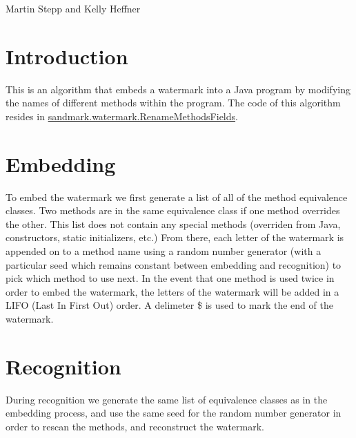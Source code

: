 %
          {Martin Stepp and Kelly Heffner}

\section{Introduction}
This is an algorithm that embeds a watermark into a Java program by 
modifying the names of different methods within the program.
The code of this algorithm
resides in \url{sandmark.watermark.RenameMethodsFields}.


\section{Embedding}
To embed the watermark we first generate a list of all of the method
equivalence classes.  Two methods are in the same equivalence class
if one method overrides the other.  This list does not contain any 
special methods (overriden from Java, constructors, static initializers, 
etc.)  From there, each letter of the watermark is appended on to a
method name using a  random number generator (with a particular seed which
remains constant between embedding and recognition) to pick which
method to use next.  In the event that one method is used twice in order
to embed the watermark, the letters of the watermark will be added in a
LIFO (Last In First Out) order.  A delimeter \$ is used to mark the end of
the watermark.  


\section{Recognition}
During recognition we generate the same list of equivalence classes as
in the embedding process, and use the same seed for the random number
generator in order to rescan the methods, and reconstruct the watermark.



